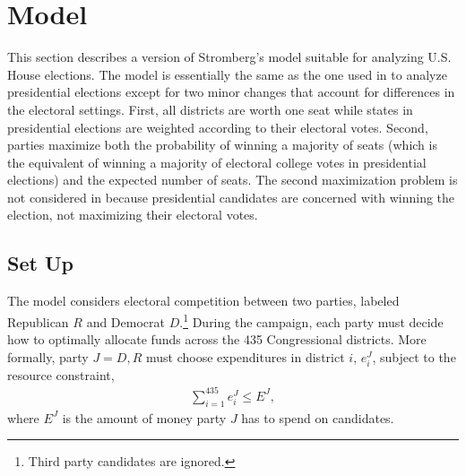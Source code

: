 \documentclass[12pt,final,fleqn]{article}
\theoremstyle{plain}
\begin{document}
\section{Model}
This section describes a version of Stromberg's model suitable for analyzing U.S. House elections. The model is essentially the same as the one used in \citet{stromberg2008electoral} to analyze presidential elections except for two minor changes that account for differences in the electoral settings. First, all districts are worth one seat while states in presidential elections are weighted according to their electoral votes. Second, parties maximize both the probability of winning a majority of seats (which is the equivalent of winning a majority of electoral college votes in presidential elections) and the expected number of seats. The second maximization problem is not considered in \citet{stromberg2008electoral} because presidential candidates are concerned with winning the election, not maximizing their electoral votes.

\subsection{Set Up}
The model considers electoral competition between two parties, labeled Republican $R$ and Democrat $D$.\footnote{Third party candidates are ignored.} During the campaign, each party must decide how to optimally allocate funds across the 435 Congressional districts. More formally, party $J = D, R$ must choose expenditures in district $i$, $e^J_i$, subject to the resource constraint, 
\begin{align} \label{eqn: budget constraint}
\sum_{i=1}^{435} e^J_i \leq E^J,
\end{align}
where $E^J$ is the amount of money party $J$ has to spend on candidates.
\end{document}
